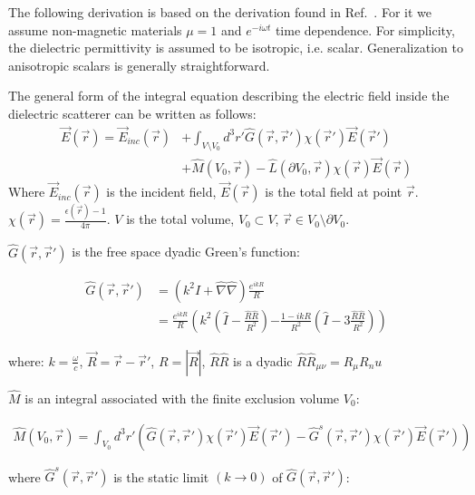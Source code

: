     The following derivation is based on the derivation found in Ref.~\cite{yurkin2007discrete}. For it we assume
    non-magnetic materials $\mu = 1$ and $e^{-i\omega t}$ time dependence. For simplicity, the dielectric permittivity is assumed
    to be isotropic, i.e. scalar. Generalization to anisotropic scalars is generally straightforward.

    The general form of the integral equation describing the electric field inside the dielectric scatterer can be written as follows:
    \begin{align}
        \vec{E}(\vec{r}) = \vec{E}_{inc}(\vec{r}) &+ \int_{V \setminus V_0}d^3r' \hat{G}(\vec{r}, \vec{r}')\chi(\vec{r}')\vec{E}(\vec{r}')\nonumber\\
                        &+ \hat{M}(V_0, \vec{r}) - \hat{L}(\partial V_0, \vec{r})\chi(\vec{r})\vec{E}(\vec{r})
    \end{align}
    Where $\vec{E}_{inc}(\vec{r})$ is the incident field, $\vec{E}(\vec{r})$ is the total field at point $\vec{r}$.
    $\chi(\vec{r}) = \frac{\epsilon(\vec{r}) - 1}{4\pi}$. $V$ is the total volume, $V_0 \subset V$, $\vec{r} \in V_0\setminus \partial V_0$.

    $\hat{G}(\vec{r}, \vec{r}')$ is the free space dyadic Green's function:

    \begin{align}
        \hat{G}(\vec{r}, \vec{r}') &= \left(k^2\hat{I}+\hat{\nabla}\hat{\nabla}\right)\frac{e^{ikR}}{R} \\
                                    &= \frac{e^{ikR}}{R}\left(k^2\left(\hat{I}-\frac{\hat{R}\hat{R}}{R^2}\right)\right.
                                        \left.-\frac{1-ikR}{R^2}\left(\hat{I} -3 \frac{\hat{R}\hat{R}}{R^2}\right)\right)
    \end{align}

    where: $k = \frac{\omega}{c}$, $\vec{R} = \vec{r} - \vec{r}'$, $R = |\vec{R}|$, $\hat{R}\hat{R}$ is a dyadic $\hat{R}\hat{R}_{\mu\nu} = R_\mu R_nu$

    $\hat{M}$ is an integral associated with the finite exclusion volume $V_0$:

    \begin{align}
        \hat{M}(V_0, \vec{r}) = \int_{V_0}d^3r'\left(\hat{G}(\vec{r}, \vec{r}')\chi(\vec{r}')\vec{E}(\vec{r}')
                                - \hat{G}^s(\vec{r}, \vec{r}')\chi(\vec{r}')\vec{E}(\vec{r}')\right)
    \end{align}

    where $\hat{G}^s(\vec{r}, \vec{r}')$ is the static limit $(k \rightarrow 0)$ of $\hat{G}(\vec{r}, \vec{r}')$:

